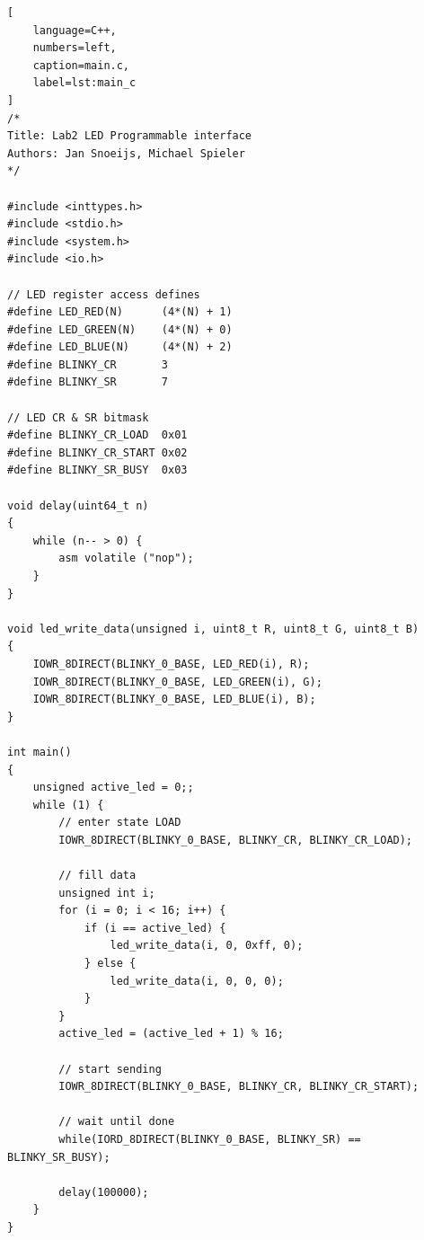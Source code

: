 \documentclass{article}
\begin{document}
\begin{lstlisting}[
    language=C++,
    numbers=left,
    caption=main.c,
    label=lst:main_c
]
/*
Title: Lab2 LED Programmable interface
Authors: Jan Snoeijs, Michael Spieler
*/

#include <inttypes.h>
#include <stdio.h>
#include <system.h>
#include <io.h>

// LED register access defines
#define LED_RED(N)      (4*(N) + 1)
#define LED_GREEN(N)    (4*(N) + 0)
#define LED_BLUE(N)     (4*(N) + 2)
#define BLINKY_CR       3
#define BLINKY_SR       7

// LED CR & SR bitmask
#define BLINKY_CR_LOAD  0x01
#define BLINKY_CR_START 0x02
#define BLINKY_SR_BUSY  0x03

void delay(uint64_t n)
{
    while (n-- > 0) {
        asm volatile ("nop");
    }
}

void led_write_data(unsigned i, uint8_t R, uint8_t G, uint8_t B)
{
    IOWR_8DIRECT(BLINKY_0_BASE, LED_RED(i), R);
    IOWR_8DIRECT(BLINKY_0_BASE, LED_GREEN(i), G);
    IOWR_8DIRECT(BLINKY_0_BASE, LED_BLUE(i), B);
}

int main()
{
    unsigned active_led = 0;;
    while (1) {
        // enter state LOAD
        IOWR_8DIRECT(BLINKY_0_BASE, BLINKY_CR, BLINKY_CR_LOAD);

        // fill data
        unsigned int i;
        for (i = 0; i < 16; i++) {
            if (i == active_led) {
                led_write_data(i, 0, 0xff, 0);
            } else {
                led_write_data(i, 0, 0, 0);
            }
        }
        active_led = (active_led + 1) % 16;

        // start sending
        IOWR_8DIRECT(BLINKY_0_BASE, BLINKY_CR, BLINKY_CR_START);

        // wait until done
        while(IORD_8DIRECT(BLINKY_0_BASE, BLINKY_SR) == BLINKY_SR_BUSY);

        delay(100000);
    }
}
\end{lstlisting}
\end{document}
